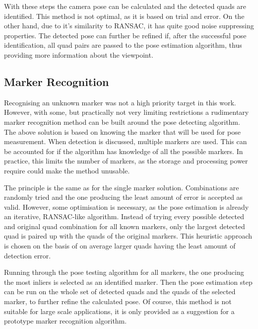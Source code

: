 With these steps the camera pose can be calculated and the detected quads are identified.
This method is not optimal, as it is based on trial and error.
On the other hand, due to it's similarity to RANSAC, it has quite good noise suppressing properties.
The detected pose can further be refined if, after the successful pose identification, all quad pairs are passed to the pose estimation algorithm, thus providing more information about the viewpoint.

\subsection{Marker Recognition}

Recognising an unknown marker was not a high priority target in this work.
However, with some, but practically not very limiting restrictions a rudimentary marker recognition method can be built around the pose detecting algorithm.
The above solution is based on knowing the marker that will be used for pose measurement.
When detection is discussed, multiple markers are used.
This can be accounted for if the algorithm has knowledge of all the possible markers.
In practice, this limits the number of markers, as the storage and processing power require could make the method unusable.

The principle is the same as for the single marker solution.
Combinations are randomly tried and the one producing the least amount of error is accepted as valid.
However, some optimisation is necessary, as the pose estimation is already an iterative, RANSAC-like algorithm.
Instead of trying every possible detected and original quad combination for all known markers, only the largest detected quad is paired up with the quads of the original markers.
This heuristic approach is chosen on the basis of on average larger quads having the least amount of detection error.

Running through the pose testing algorithm for all markers, the one producing the most inliers is selected as an identified marker.
Then the pose estimation step can be run on the whole set of detected quads and the quads of the selected marker, to further refine the calculated pose.
Of course, this method is not suitable for large scale applications, it is only provided as a suggestion for a prototype marker recognition algorithm.